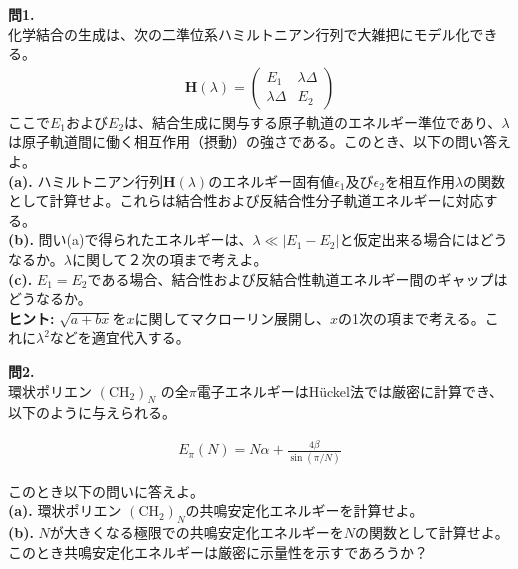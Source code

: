 \documentclass{jlreq}
\begin{document}
\noindent
\textbf{問1.}\\

\noindent
化学結合の生成は、次の二準位系ハミルトニアン行列で大雑把にモデル化できる。
\begin{eqnarray}
    \mathbf{H}(\lambda)=
    \begin{pmatrix}
    E_1 & \lambda\Delta \\ 
    \lambda\Delta & E_2
    \end{pmatrix}
\end{eqnarray}
ここで$E_1$および$E_2$は、結合生成に関与する原子軌道のエネルギー準位であり、$\lambda$は原子軌道間に働く相互作用（摂動）の強さである。このとき、以下の問い答えよ。\\

\noindent
\textbf{(a).} ハミルトニアン行列$\mathbf{H}(\lambda)$のエネルギー固有値$\epsilon_1$及び$\epsilon_2$を相互作用$\lambda$の関数として計算せよ。これらは結合性および反結合性分子軌道エネルギーに対応する。\\
\noindent
\textbf{(b).} 問い(a)で得られたエネルギーは、$\lambda \ll |E_1-E_2|$と仮定出来る場合にはどうなるか。$\lambda$に関して２次の項まで考えよ。\\
\noindent
\textbf{(c).} $E_1=E_2$である場合、結合性および反結合性軌道エネルギー間のギャップはどうなるか。\\

\noindent
\textbf{ヒント:} $\sqrt{a+bx}$を$x$に関してマクローリン展開し、$x$の1次の項まで考える。これに$\lambda^2$などを適宜代入する。

\clearpage

\noindent
\textbf{問2.}\\

\noindent
環状ポリエン $(\text{CH}_2)_N$ の全$\pi$電子エネルギーはH\"uckel法では厳密に計算でき、以下のように与えられる。

\begin{eqnarray}
    E_\pi(N)=N\alpha+\frac{4\beta}{\sin(\pi/N)}
\end{eqnarray}

\noindent
このとき以下の問いに答えよ。\\

\noindent
\textbf{(a).} 環状ポリエン $(\text{CH}_2)_N$の共鳴安定化エネルギーを計算せよ。\\
\noindent
\textbf{(b).} $N$が大きくなる極限での共鳴安定化エネルギーを$N$の関数として計算せよ。このとき共鳴安定化エネルギーは厳密に示量性を示すであろうか？\\
\end{document}
